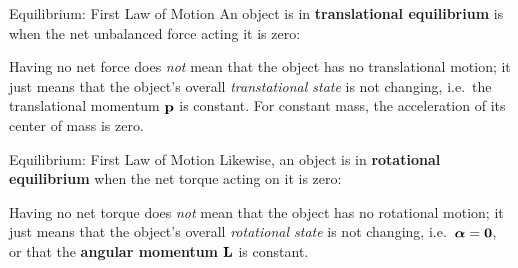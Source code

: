 \documentclass[12pt,compress,aspectratio=169]{beamer}
\newcommand{\mb}[1]{\ensuremath\mathbf{#1}}
\newcommand{\eq}[2]{\vspace{#1}{\Large\begin{displaymath}#2\end{displaymath}}}
\begin{document}
\begin{frame}{Equilibrium: First Law of Motion}
  An object is in \textbf{translational equilibrium} is when the net unbalanced
  force acting it is zero:
  
  \eq{-.2in}{
    \mb{F}_\text{net}=\mb{0}
  }

  Having no net force does \emph{not} mean that the object has no translational
  motion; it just means that the object's overall \emph{transtational state} is
  not changing, i.e.\ the translational momentum $\mb{p}$ is constant. For
  constant mass, the acceleration of its center of mass is zero.
\end{frame}



\begin{frame}{Equilibrium: First Law of Motion}
  Likewise, an object is in \textbf{rotational equilibrium} when the net torque
  acting on it is zero:

  \eq{-.3in}{
    \bm{\tau}_\text{net}=\mb{0}
  }
  
  Having no net torque does \emph{not} mean that the object has no rotational
  motion; it just means that the object's overall \emph{rotational state} is
  not changing, i.e.\ $\bm{\alpha}=\mb{0}$, or that the
  \textbf{angular momentum} $\mb{L}$ is constant.
\end{frame}
\end{document}
